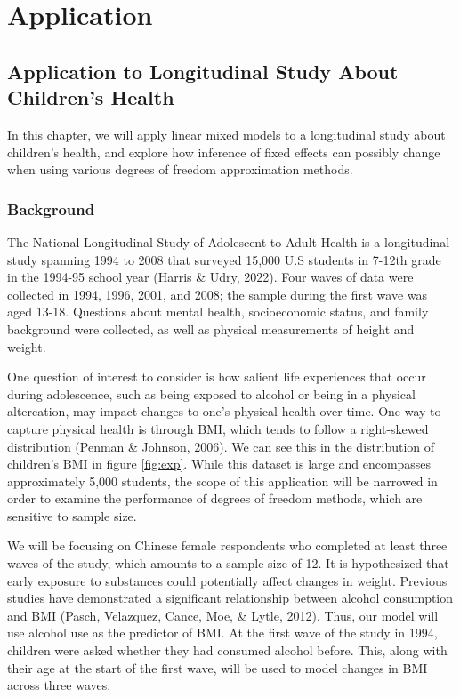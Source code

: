 \documentclass[12pt, twoside]{amherstthesis}
\begin{document}
\hypertarget{math-sci}{%
\chapter{Application}\label{math-sci}}

\hypertarget{application-to-longitudinal-study-about-childrens-health}{%
\section{Application to Longitudinal Study About Children's Health}\label{application-to-longitudinal-study-about-childrens-health}}

In this chapter, we will apply linear mixed models to a longitudinal study about children's health, and explore how inference of fixed effects can possibly change when using various degrees of freedom approximation methods.

\hypertarget{background}{%
\subsection{Background}\label{background}}

The National Longitudinal Study of Adolescent to Adult Health is a longitudinal study spanning 1994 to 2008 that surveyed 15,000 U.S students in 7-12th grade in the 1994-95 school year (Harris \& Udry, 2022). Four waves of data were collected in 1994, 1996, 2001, and 2008; the sample during the first wave was aged 13-18. Questions about mental health, socioeconomic status, and family background were collected, as well as physical measurements of height and weight.

One question of interest to consider is how salient life experiences that occur during adolescence, such as being exposed to alcohol or being in a physical altercation, may impact changes to one's physical health over time. One way to capture physical health is through BMI, which tends to follow a right-skewed distribution (Penman \& Johnson, 2006). We can see this in the distribution of children's BMI in figure \ref{fig:exp}. While this dataset is large and encompasses approximately 5,000 students, the scope of this application will be narrowed in order to examine the performance of degrees of freedom methods, which are sensitive to sample size.

We will be focusing on Chinese female respondents who completed at least three waves of the study, which amounts to a sample size of 12. It is hypothesized that early exposure to substances could potentially affect changes in weight. Previous studies have demonstrated a significant relationship between alcohol consumption and BMI (Pasch, Velazquez, Cance, Moe, \& Lytle, 2012). Thus, our model will use alcohol use as the predictor of BMI.
At the first wave of the study in 1994, children were asked whether they had consumed alcohol before. This, along with their age at the start of the first wave, will be used to model changes in BMI across three waves.
\end{document}
